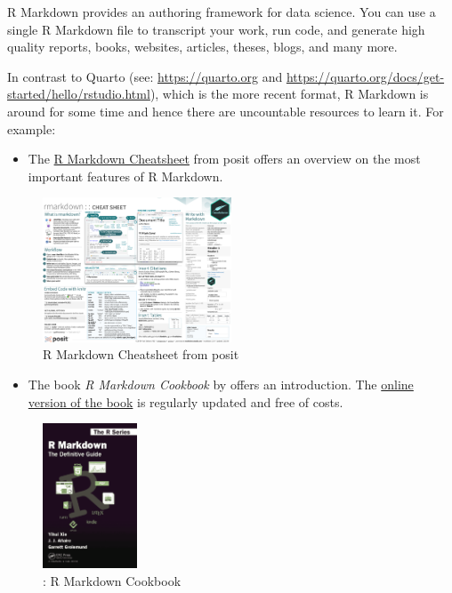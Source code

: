 \documentclass[
  12pt,
  oneside]{book}
\providecommand{\tightlist}{%
  \setlength{\itemsep}{0pt}\setlength{\parskip}{0pt}}
\theoremstyle{definition}
\theoremstyle{definition}
\theoremstyle{definition}
\theoremstyle{definition}
\theoremstyle{remark}
\begin{document}
R Markdown provides an authoring framework for data science. You can use a single
R Markdown file to transcript your work, run code, and generate high quality reports, books, websites, articles, theses, blogs, and many more.

In contrast to Quarto (see: \url{https://quarto.org} and \url{https://quarto.org/docs/get-started/hello/rstudio.html}), which is the more recent format, R Markdown is around for some time and hence there are uncountable resources to learn it. For example:

\begin{itemize}
\tightlist
\item
  The \href{https://raw.githubusercontent.com/rstudio/cheatsheets/main/rmarkdown.pdf}{R Markdown Cheatsheet} from posit offers an overview on the most important features of R Markdown.
\end{itemize}

\begin{figure}
\centering
\includegraphics[width=0.5\textwidth,height=\textheight]{fig/rmdcheat.png}
\caption{\label{fig:rmdcheat} R Markdown Cheatsheet from posit}
\end{figure}

\begin{itemize}
\tightlist
\item
  The book \emph{R Markdown Cookbook} by \citet{Xie2020R} offers an introduction. The \href{https://bookdown.org/yihui/rmarkdown-cookbook}{online version of the book} is regularly updated and free of costs.
\end{itemize}

\begin{figure}
\centering
\includegraphics[width=0.25\textwidth,height=\textheight]{fig/rmarkdownbook.png}
\caption{\citet{Xie2020R}: R Markdown Cookbook}
\end{figure}
\end{document}
